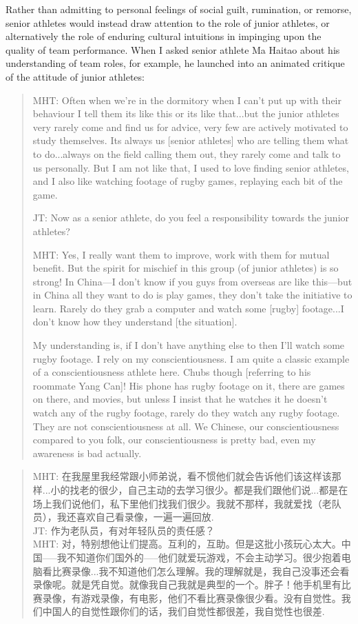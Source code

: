 \begin{CJK}{UTF8}{gbsn}
Rather than admitting to personal feelings of social guilt, rumination, or remorse, senior athletes would instead draw attention to the role of junior athletes, or alternatively the role of enduring cultural intuitions in impinging upon the quality of team performance.  When I asked senior athlete Ma Haitao about his understanding of team roles, for example, he launched into an animated critique of the attitude of junior athletes:

  \begin{quote}
    MHT: Often when we're in the dormitory when I can't put up with their behaviour I tell them its like this or its like that...but the junior athletes very rarely come and find us for advice, very few are actively motivated to study themselves. Its always us [senior athletes] who are telling them what to do...always on the field calling them out, they rarely come and talk to us personally.  But I am not like that, I used to love finding senior athletes, and I also like watching footage of rugby games, replaying each bit of the game.

    JT: Now as a senior athlete, do you feel a responsibility towards the junior athletes?

    MHT: Yes, I really want them to improve, work with them for mutual benefit.  But the spirit for mischief in this group (of junior athletes) is so strong! In China---I don't know if you guys from overseas are like this---but in China all they want to do is play games, they don't take the initiative to learn.  Rarely do they grab a computer and watch some [rugby] footage...I don’t know how they understand [the situation].

    My understanding is, if I don’t have anything else to then I’ll watch some rugby footage. I rely on my conscientiousness.  I am quite a classic example of a conscientiousness athlete here.  Chubs though [referring to his roommate Yang Can]!  His phone has rugby footage on it, there are games on there, and movies, but unless I insist that he watches it he doesn't watch any of the rugby footage, rarely do they watch any rugby footage.  They are not conscientiousness at all. We Chinese, our conscientiousness compared to you folk, our conscientiousness is pretty bad, even my awareness is bad actually.
  \end{quote}

  \begin{quote}
    MHT: 在我屋里我经常跟小师弟说，看不惯他们就会告诉他们该这样该那样...小的找老的很少，自己主动的去学习很少。都是我们跟他们说...都是在场上我们说他们，私下里他们找我们很少。我就不那样，我就爱找（老队员），我还喜欢自己看录像，一遍一遍回放. \\
    JT: 作为老队员，有对年轻队员的责任感？
    \\
    MHT: 对，特别想他让们提高。互利的，互助。但是这批小孩玩心太大。中国—--我不知道你们国外的—--他们就爱玩游戏，不会主动学习。很少抱着电脑看比赛录像...我不知道他们怎么理解。我的理解就是，我自己没事还会看录像呢。就是凭自觉。就像我自己我就是典型的一个。胖子！他手机里有比赛录像，有游戏录像，有电影，他们不看比赛录像很少看。没有自觉性。我们中国人的自觉性跟你们的话，我们自觉性都很差，我自觉性也很差.
  \end{quote}


\end{CJK}
